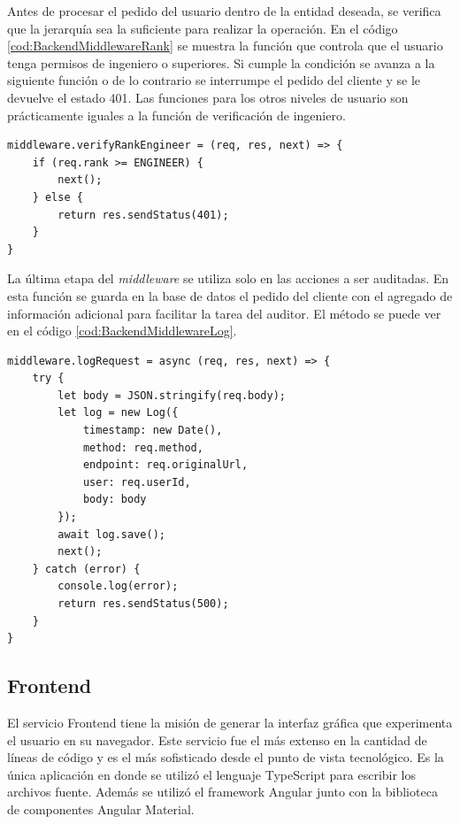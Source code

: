 Antes de procesar el pedido del usuario dentro de la entidad deseada, se verifica que la jerarquía sea la suficiente para realizar la operación.
En el código \ref{cod:BackendMiddlewareRank} se muestra la función que controla que el usuario tenga permisos de ingeniero o superiores.
Si cumple la condición se avanza a la siguiente función o de lo contrario se interrumpe el pedido del cliente y se le devuelve el estado 401.
Las funciones para los otros niveles de usuario son prácticamente iguales a la función de verificación de ingeniero.

\begin{lstlisting}[label=cod:BackendMiddlewareRank,caption=Verificación de rango]
middleware.verifyRankEngineer = (req, res, next) => {
    if (req.rank >= ENGINEER) {
        next();
    } else {
        return res.sendStatus(401);
    }
}
\end{lstlisting}

La última etapa del \emph{middleware} se utiliza solo en las acciones a ser auditadas.
En esta función se guarda en la base de datos el pedido del cliente con el agregado de información adicional para facilitar la tarea del auditor. El método se puede ver en el código \ref{cod:BackendMiddlewareLog}.

\begin{lstlisting}[label=cod:BackendMiddlewareLog,caption=Persistencia de la operación]
middleware.logRequest = async (req, res, next) => {
    try {
        let body = JSON.stringify(req.body);
        let log = new Log({
            timestamp: new Date(),
            method: req.method,
            endpoint: req.originalUrl,
            user: req.userId,
            body: body
        });
        await log.save();
        next();
    } catch (error) {
        console.log(error);
        return res.sendStatus(500);
    }
}
\end{lstlisting}

\subsection{Frontend}

El servicio Frontend tiene la misión de generar la interfaz gráfica que experimenta el usuario en su navegador.
Este servicio fue el más extenso en la cantidad de líneas de código y es el más sofisticado desde el punto de vista tecnológico.
Es la única aplicación en donde se utilizó el lenguaje TypeScript para escribir los archivos fuente.
Además se utilizó el framework Angular junto con la biblioteca de componentes Angular Material.

